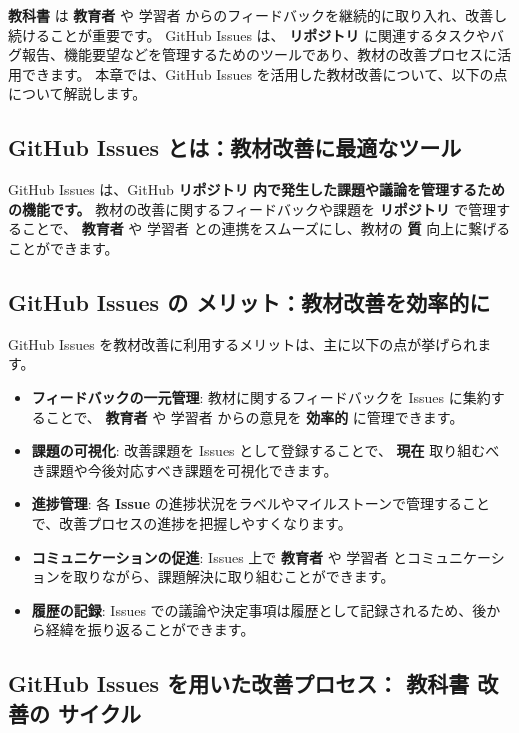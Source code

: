 
\textbf{教科書} は \textbf{教育者} や 学習者 からのフィードバックを継続的に取り入れ、改善し続けることが重要です。
GitHub Issues は、 \textbf{リポジトリ} に関連するタスクやバグ報告、機能要望などを管理するためのツールであり、教材の改善プロセスに活用できます。
本章では、GitHub Issues を活用した教材改善について、以下の点について解説します。

\subsection{GitHub Issues とは：教材改善に最適なツール}

GitHub Issues は、GitHub \textbf{リポジトリ} \textbf{内で発生した課題や議論を管理するための機能です。}
教材の改善に関するフィードバックや課題を \textbf{リポジトリ} で管理することで、 \textbf{教育者} や 学習者 との連携をスムーズにし、教材の \textbf{質} 向上に繋げることができます。

\subsection{GitHub Issues の メリット：教材改善を効率的に}

GitHub Issues を教材改善に利用するメリットは、主に以下の点が挙げられます。

\begin{itemize}
    \item \textbf{フィードバックの一元管理}: 教材に関するフィードバックを Issues に集約することで、 \textbf{教育者} や 学習者 からの意見を \textbf{効率的} に管理できます。
    \item \textbf{課題の可視化}: 改善課題を Issues として登録することで、 \textbf{現在} 取り組むべき課題や今後対応すべき課題を可視化できます。
    \item \textbf{進捗管理}: 各 \textbf{Issue} の進捗状況をラベルやマイルストーンで管理することで、改善プロセスの進捗を把握しやすくなります。
    \item \textbf{コミュニケーションの促進}: Issues 上で \textbf{教育者} や 学習者 とコミュニケーションを取りながら、課題解決に取り組むことができます。
    \item \textbf{履歴の記録}: Issues での議論や決定事項は履歴として記録されるため、後から経緯を振り返ることができます。
\end{itemize}

\subsection{GitHub Issues を用いた改善プロセス： \textbf{教科書} 改善の \textbf{サイクル}}

